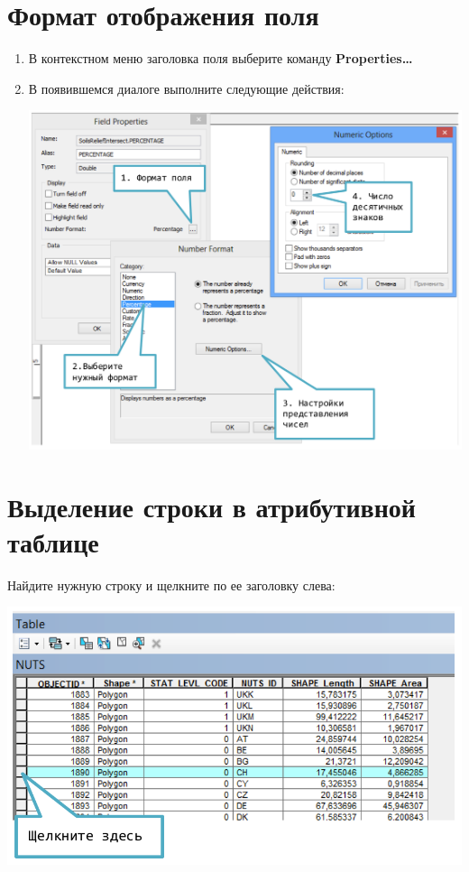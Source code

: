 \documentclass[]{book}
\theoremstyle{definition}
\theoremstyle{definition}
\theoremstyle{definition}
\theoremstyle{remark}
\begin{document}
\hypertarget{--}{%
\section{Формат отображения поля}\label{--}}

\begin{enumerate}
\def\labelenumi{\arabic{enumi}.}
\item
  В контекстном меню заголовка поля выберите команду
  \textbf{Properties\ldots{}}
\item
  В появившемся диалоге выполните следующие действия:

  \includegraphics{images/Appendix/image70.png}
\end{enumerate}

\hypertarget{----}{%
\section{Выделение строки в атрибутивной таблице}\label{----}}

Найдите нужную строку и щелкните по ее заголовку слева:

\includegraphics{images/Appendix/image71.png}
\end{document}
